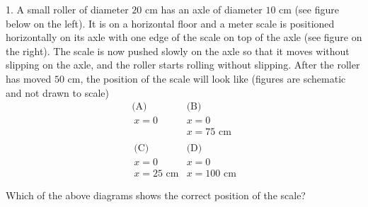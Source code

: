  1. A small roller of diameter \(20\text{ cm}\) has an axle of diameter \(10\text{ cm}\) (see figure below on the left). It is on a horizontal floor and a meter scale is positioned horizontally on its axle with one edge of the scale on top of the axle (see figure on the right). The scale is now pushed slowly on the axle so that it moves without slipping on the axle, and the roller starts rolling without slipping. After the roller has moved \(50\text{ cm}\), the position of the scale will look like (figures are schematic and not drawn to scale)
$$\begin{array}{cc} \text{(A)} & \text{(B)} \\\ x=0 & x=0 \\\ & x=75\text{ cm} \\\ & \\\ \text{(C)} & \text{(D)} \\\ x=0 & x=0 \\\ x=25\text{ cm} & x=100\text{ cm} \end{array}$$

Which of the above diagrams shows the correct position of the scale?